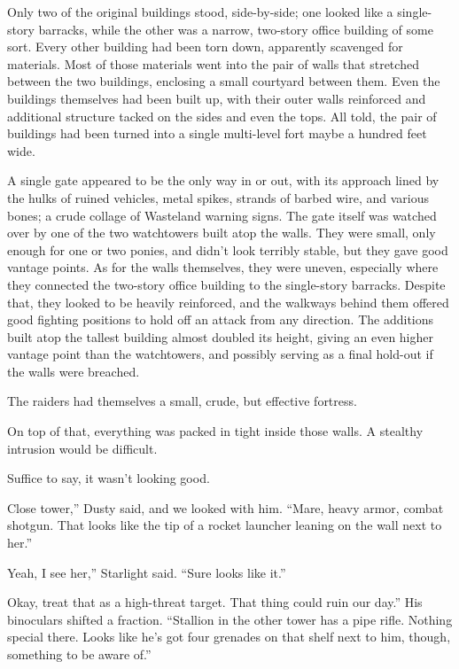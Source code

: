 Only two of the original buildings stood, side-by-side; one looked like a single-story barracks, while the other was a narrow, two-story office building of some sort. Every other building had been torn down, apparently scavenged for materials. Most of those materials went into the pair of walls that stretched between the two buildings, enclosing a small courtyard between them. Even the buildings themselves had been built up, with their outer walls reinforced and additional structure tacked on the sides and even the tops. All told, the pair of buildings had been turned into a single multi-level fort maybe a hundred feet wide.

A single gate appeared to be the only way in or out, with its approach lined by the hulks of ruined vehicles, metal spikes, strands of barbed wire, and various bones; a crude collage of Wasteland warning signs. The gate itself was watched over by one of the two watchtowers built atop the walls. They were small, only enough for one or two ponies, and didn’t look terribly stable, but they gave good vantage points. As for the walls themselves, they were uneven, especially where they connected the two-story office building to the single-story barracks. Despite that, they looked to be heavily reinforced, and the walkways behind them offered good fighting positions to hold off an attack from any direction. The additions built atop the tallest building almost doubled its height, giving an even higher vantage point than the watchtowers, and possibly serving as a final hold-out if the walls were breached.

The raiders had themselves a small, crude, but effective fortress.

On top of that, everything was packed in tight inside those walls. A stealthy intrusion would be difficult.

Suffice to say, it wasn’t looking good.

\leavevmode{}Close tower,” Dusty said, and we looked with him. “Mare, heavy armor, combat shotgun. That looks like the tip of a rocket launcher leaning on the wall next to her.”

\leavevmode{}Yeah, I see her,” Starlight said. “Sure looks like it.”

\leavevmode{}Okay, treat that as a high-threat target. That thing could ruin our day.” His binoculars shifted a fraction. “Stallion in the other tower has a pipe rifle. Nothing special there. Looks like he’s got four grenades on that shelf next to him, though, something to be aware of.”

